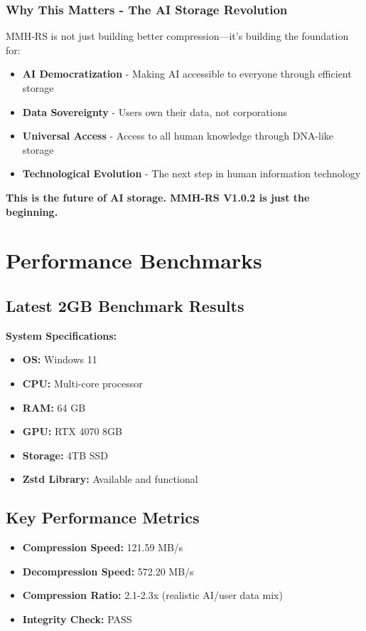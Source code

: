 \documentclass[11pt,a4paper]{article}
\begin{document}
	\subsubsection{Why This Matters - The AI Storage Revolution}

	MMH-RS is not just building better compression—it's building the foundation for:
	\begin{itemize}
		\item \textbf{AI Democratization} - Making AI accessible to everyone through efficient storage
		\item \textbf{Data Sovereignty} - Users own their data, not corporations
		\item \textbf{Universal Access} - Access to all human knowledge through DNA-like storage
		\item \textbf{Technological Evolution} - The next step in human information technology
	\end{itemize}

	\textbf{This is the future of AI storage. MMH-RS V1.0.2 is just the beginning.}

	\section{Performance Benchmarks}
	\label{sec:benchmarks}

	\subsection{Latest 2GB Benchmark Results}

	\textbf{System Specifications:}
	\begin{itemize}
		\item \textbf{OS:} Windows 11
		\item \textbf{CPU:} Multi-core processor
		\item \textbf{RAM:} 64 GB
		\item \textbf{GPU:} RTX 4070 8GB
		\item \textbf{Storage:} 4TB SSD
		\item \textbf{Zstd Library:} Available and functional
	\end{itemize}

	\subsection{Key Performance Metrics}
	\begin{itemize}
		\item \textbf{Compression Speed:} 121.59 MB/s
		\item \textbf{Decompression Speed:} 572.20 MB/s
		\item \textbf{Compression Ratio:} 2.1-2.3x (realistic AI/user data mix)
		\item \textbf{Integrity Check:} PASS
	\end{itemize}
\end{document}
